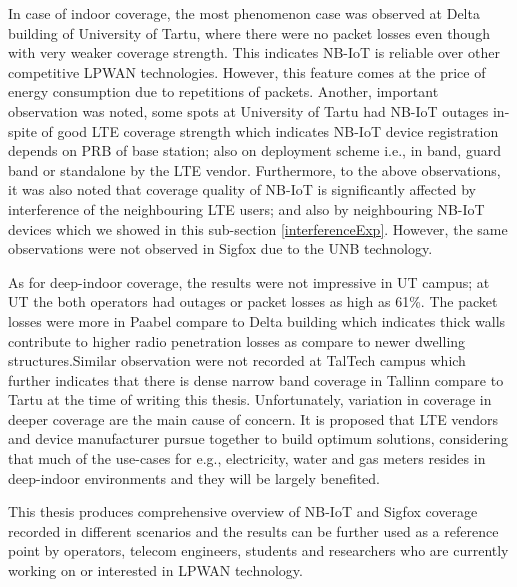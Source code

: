 \documentclass[12pt]{article}
\begin{document}
In case of indoor coverage, the most phenomenon case was observed at Delta building of University of Tartu, where there were no packet losses even though with very weaker coverage strength. This indicates NB-IoT is reliable over other competitive LPWAN technologies. However, this feature comes at the price of energy consumption due to repetitions of packets. Another, important observation was noted, some spots at University of Tartu had NB-IoT outages in-spite of good LTE coverage strength which indicates NB-IoT device registration depends on PRB of base station; also on deployment scheme i.e., in band, guard band or standalone by the LTE vendor. Furthermore, to the above observations, it was also noted that coverage quality of NB-IoT is significantly affected by interference of the neighbouring LTE users; and also by neighbouring NB-IoT devices which we showed in this sub-section \ref{interferenceExp}. However, the same observations were not observed in Sigfox due to the UNB technology.\par

As for deep-indoor coverage, the results were not impressive in UT campus; at UT the both operators had outages or packet losses as high as 61\%. The packet losses were more in Paabel compare to Delta building which indicates thick walls contribute to higher radio penetration losses as compare to newer dwelling structures.Similar observation were not recorded at TalTech campus which further indicates that there is dense narrow band coverage in Tallinn compare to Tartu at the time of writing this thesis. Unfortunately, variation in coverage in deeper coverage are the main cause of concern. It is proposed that LTE vendors and device manufacturer pursue together to build optimum solutions, considering that much of the use-cases for e.g., electricity, water and gas meters resides in deep-indoor environments and they will be largely benefited. 


This thesis produces comprehensive overview of NB-IoT and Sigfox coverage recorded in different scenarios and the results  can  be  further  used as a reference point by operators, telecom engineers, students and researchers who are currently working on or interested in LPWAN technology.\par 
\end{document}
